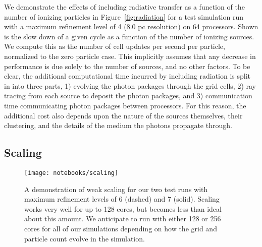 \documentclass[11pt]{article}
\begin{document}
We demonstrate the effects of including radiative transfer as a function of the number of ionizing particles in Figure~\ref{fig:radiation} for a test simulation run with a maximum refinement level of 4 (8.0 pc resolution) on 64 processors. Shown is the slow down of a given cycle as a function of the number of ionizing sources. We compute this as the number of cell updates per second per particle, normalized to the zero particle case. This implicitly assumes that any decrease in performance is due solely to the number of sources, and no other factors. To be clear, the additional computational time incurred by including radiation is split in into three parts, 1) evolving the photon packages through the grid cells, 2) ray tracing from each source to deposit the photon packages, and 3) communication time communicating photon packages between processors. For this reason, the additional cost also depends upon the nature of the sources themselves, their clustering, and the details of the medium the photons propagate through.

\subsection{Scaling}

\begin{figure}
\centering
\texttt{[image: notebooks/scaling]}
\caption{A demonstration of weak scaling for our two test runs with maximum refinement levels of 6 (dashed) and 7 (solid). Scaling works very well for up to 128 cores, but becomes less than ideal about this amount. We anticipate to run with either 128 or 256 cores for all of our simulations depending on how the grid and particle count evolve in the simulation.}
\label{fig:scaling}
\end{figure}



\end{document}
